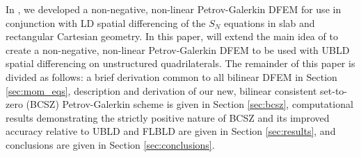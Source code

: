 \documentclass{mc2015}
\begin{document}
In \cite{csz_me}, we developed a non-negative, non-linear Petrov-Galerkin DFEM for use in conjunction with LD spatial differencing of the $S_N$ equations in slab and rectangular Cartesian geometry.  
In this paper, will extend the main idea of \cite{csz_me} to create a non-negative, non-linear Petrov-Galerkin DFEM to be used with UBLD spatial differencing on unstructured quadrilaterals.
The remainder of this paper is divided as follows: a brief derivation common to all bilinear DFEM in Section \ref{sec:mom_eqs}, description and derivation of our new, bilinear consistent set-to-zero (BCSZ) Petrov-Galerkin scheme is given in Section \ref{sec:bcsz},  computational results demonstrating the strictly positive nature of BCSZ and its improved accuracy relative to UBLD and FLBLD are given in Section \ref{sec:results}, and conclusions are given in Section \ref{sec:conclusions}.
\end{document}
